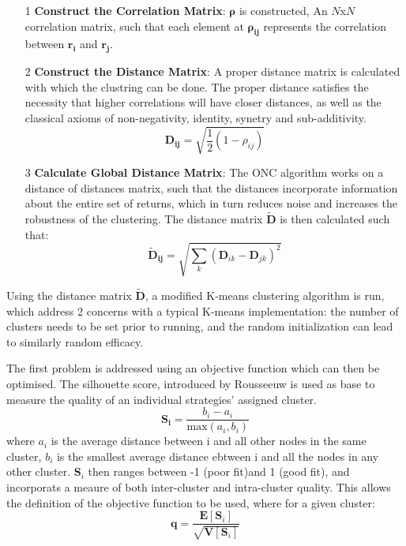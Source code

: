 \documentclass[a4paper,11pt,oneside]{article}
\theoremstyle{plain}
\theoremstyle{definition}
\begin{document}
	\begin{itemize}
		\item [1] \textbf{Construct the Correlation Matrix}: $\mathbf{\rho}$ is constructed, An $N$x$N$ correlation matrix, such that each element at $\mathbf{\rho_{ij}}$ represents the correlation between $\mathbf{r_i}$ and $\mathbf{r_j}$.
		\newline
		\item [2] \textbf{Construct the Distance Matrix}: A proper distance matrix is calculated with which the clustring can be done. The proper distance satisfies the necessity that higher correlations will  have closer distances, as well as the classical axioms of non-negativity, identity, synetry and sub-additivity.
		\begin{equation}
			\mathbf{D_{ij}} = \sqrt{\frac{1}{2}\left(1 - \rho_{ij}\right)}
		\end{equation} 
		\item[3] \textbf{Calculate Global Distance Matrix}: The ONC algorithm works on a distance of distances matrix, such that the distances incorporate information about the entire set of returns, which in turn reduces noise and increases the robustness of the clustering\cite{LopezPrado2016a}. The distance matrix $\mathbf{\tilde{D}}$ is then calculated such that:
				\begin{equation}
				\mathbf{\tilde{D}_{ij}} = \sqrt{\sum_{k}\left(\mathbf{D}_{ik} - \mathbf{D}_{jk}\right)^2}
				\end{equation} 
	\end{itemize}
	
	Using the distance matrix $\mathbf{\tilde{D}}$, a modified K-means clustering algorithm is run, which address 2 concerns with a typical K-means implementation: the number of clusters needs to be set prior to running, and the random initialization can lead to similarly random efficacy. \newline
	
	The first problem is addressed using an objective function which can then be optimised. The silhouette score, introduced by Rousseeuw \cite{Rousseeouw1987} is used as base to measure the quality of an individual strategies' assigned cluster.
	\begin{equation}
	\mathbf{S_i} = \frac{b_i - a_i}{\mathrm{max}\left(a_i, b_i\right)}
	\end{equation}
	where $a_i$ is the average distance between i and all other nodes in the same cluster, $b_i$ is the smallest average distance ebtween i and all the nodes in any other cluster. $\mathbf{S}_i$ then ranges between -1 (poor fit)and 1 (good fit), and incorporats a meaure of both inter-cluster and intra-cluster quality. This allows the definition of the objective function to be used, where for a given cluster:
	\begin{equation}\label{eq_clsuter_q}
	\mathbf{q} = \frac{\mathbf{E}[{\mathbf{S}_i}]}{\sqrt{\mathbf{V}[{\mathbf{S}_i}]}}
	\end{equation} 
	
\end{document}
